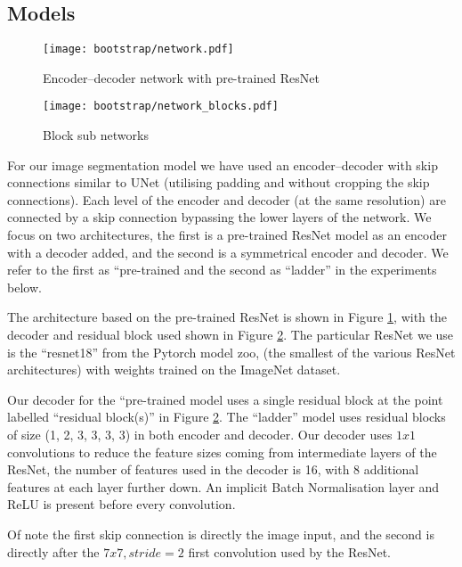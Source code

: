 \subsection {Models}

\begin{figure}[h]
  \centering
  \texttt{[image: bootstrap/network.pdf]}
  \caption{Encoder--decoder network with pre-trained ResNet}  
  \label{fig:bootstrap_network}
\end{figure}
\begin{figure}
  \centering
  \texttt{[image: bootstrap/network\_blocks.pdf]}
  \caption{Block sub networks}  
  \label{fig:bootstrap_decode_block}
\end{figure}

For our image segmentation model we have used an encoder--decoder with skip connections similar to UNet \cite{Ronneberger2015} (utilising padding and without cropping the skip connections). Each level of the encoder and decoder (at the same resolution) are connected by a skip connection bypassing the lower layers of the network. We focus on two architectures, the first is a pre-trained ResNet model as an encoder with a decoder added, and the second is a symmetrical encoder and decoder. We refer to the first as ``pre-trained and the second as ``ladder'' in the experiments below.

The architecture based on the pre-trained ResNet is shown in Figure \ref{fig:bootstrap_network}, with the decoder and residual block used shown in Figure \ref{fig:bootstrap_decode_block}. The particular ResNet we use is the ``resnet18'' from the Pytorch model zoo, (the smallest of the various ResNet architectures) with weights trained on the ImageNet dataset. 

Our decoder for the ``pre-trained model uses a single residual block at the point labelled ``residual block(s)'' in Figure \ref{fig:bootstrap_decode_block}. The ``ladder'' model uses residual blocks of size (1, 2, 3, 3, 3, 3) in both encoder and decoder. Our decoder uses $ 1x1 $ convolutions to reduce the feature sizes coming from intermediate layers of the ResNet, the number of features used in the decoder is 16, with 8 additional features at each layer further down. An implicit Batch Normalisation layer and ReLU is present before every convolution.

Of note the first skip connection is directly the image input, and the second is directly after the $7x7, stride=2$ first convolution used by the ResNet.


